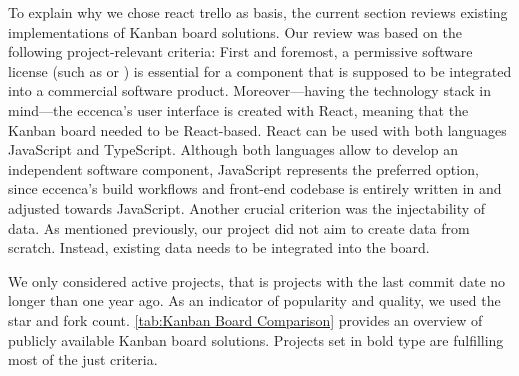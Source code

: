 To explain why we chose react trello as basis, the current section reviews existing implementations of Kanban board solutions. Our review was based on the following project-relevant criteria: First and foremost, a permissive software license (such as  or ) is essential for a component that is supposed to be integrated into a commercial software product. Moreover---having the technology stack in mind---the eccenca’s user interface is created with React, meaning that the Kanban board needed to be React-based. React can be used with both languages JavaScript and TypeScript. Although both languages allow to develop an independent software component, JavaScript represents the preferred option, since eccenca’s build workflows and front-end codebase is entirely written in and adjusted towards JavaScript. Another crucial criterion was the injectability of data. As mentioned previously, our project did not aim to create data from scratch. Instead, existing data needs to be integrated into the board.

We only considered active projects, that is projects with the last commit date no longer than one year ago. As an indicator of popularity and quality, we used the star and fork count. \autoref{tab:Kanban Board Comparison} provides an overview of publicly available Kanban board solutions. Projects set in bold type are fulfilling most of the just criteria.

